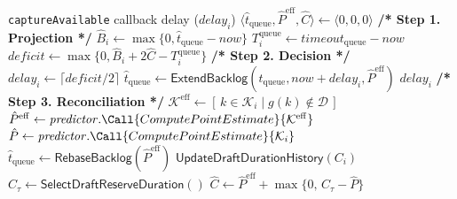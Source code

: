 \begin{algorithm}[t]
\caption{Capture-Availability Pacing}
\label{alg:pacing}
\footnotesize
\renewcommand{\algorithmicrequire}{\textbf{Input:}}
\renewcommand{\algorithmicensure}{\textbf{Output:}}
\begin{algorithmic}[1]
\Ensure \texttt{captureAvailable} callback delay ($\mathit{delay}_i$)
\State $\langle\hat t_{\mathrm{queue}},\hat P^{\mathrm{eff}},\hat C\rangle\gets\langle0,0,0\rangle$ \label{alg:pa:init} 
\State
{}
  \State \textbf{/* Step 1. Projection */}
  \State $\hat B_i\gets\max\{0,\hat t_{\mathrm{queue}}-\mathit{now}\}$ \label{alg:pa:backlog}
  \State $T_i^{\mathrm{queue}}\gets\mathit{timeout}_{\mathrm{queue}}-\mathit{now}$ \label{alg:pa:budget}
  \State $\mathit{deficit}\gets\max\{0,\hat B_i+2\hat C-T_i^{\mathrm{queue}}\}$ \label{alg:pa:deficit}
  \State
  \State \textbf{/* Step 2. Decision */}
  \State $\mathit{delay}_i\gets\lceil\mathit{deficit}/2\rceil$ \label{alg:pa:delay}
  \State $\hat t_{\mathrm{queue}}\gets\textsf{ExtendBacklog}(\hat t_{\mathrm{queue}},\mathit{now}+\mathit{delay}_i,\hat P^{\mathrm{eff}})$ \label{alg:pa:extend}
  \State \Return $\mathit{delay}_i$
\EndProcedure
\State
{}
  \State \textbf{/* Step 3. Reconciliation */}
  \State $\mathcal K^{\mathrm{eff}}\gets[\,k\in\mathcal K_i\mid g(k)\notin\mathcal D\,]$ \label{alg:pa:effective}
  \State $\hat P^{\mathrm{eff}}\gets\mathit{predictor}.\Call{ComputePointEstimate}{\mathcal K^{\mathrm{eff}}}$ \label{alg:pa:point}
  \State $\hat P\gets\mathit{predictor}.\Call{ComputePointEstimate}{\mathcal K_i}$ \label{alg:pa:configured}
  \State $\hat t_{\mathrm{queue}}\gets\textsf{RebaseBacklog}(\hat P^{\mathrm{eff}})$ \label{alg:pa:rebuild}
  \State
  \State $\textsf{UpdateDraftDurationHistory}(C_i)$ \label{alg:pa:history} 
  \State $C_\tau\gets\textsf{SelectDraftReserveDuration}()$ \label{alg:pa:quantile} 
  \State $\hat C\gets\hat P^{\mathrm{eff}}+\max\{0,\,C_\tau-\hat P\}$ \label{alg:pa:reserve}
\EndProcedure
\end{algorithmic}
\end{algorithm}
